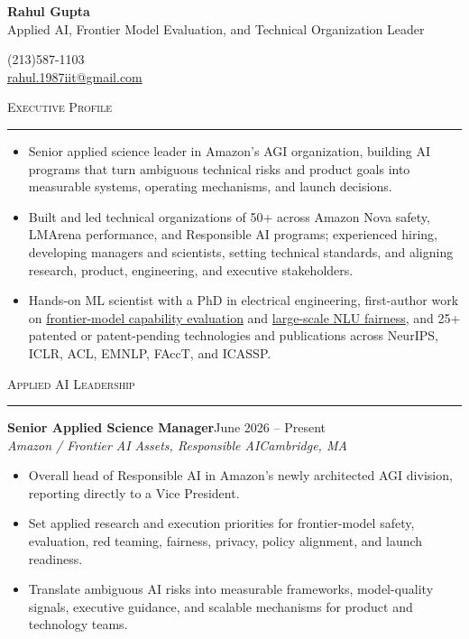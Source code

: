 \documentclass[11pt]{article}
\newcommand{\sectionheading}[1]{%
  \vspace{8pt}%
  {\large\scshape #1}\par\vspace{1pt}\hrule\vspace{3pt}%
}
\newcommand{\resumeentry}[5]{%
  \textbf{#1}\hfill #2\\
  \textit{#3}\hfill \textit{#4}
  \begin{itemize}
    #5
  \end{itemize}
  \vspace{2pt}
}
\newcommand{\socialicons}{%
  \href{https://www.linkedin.com/in/rahul-gupta-16139818}{\textcolor[HTML]{0077B5}{\Large\faLinkedin}}%
  \hspace{0.55em}%
  \href{https://scholar.google.com/citations?user=gSTLsFcAAAAJ}{\textcolor[HTML]{4285F4}{\Large\aiGoogleScholarSquare}}%
}
\begin{document}
\begin{center}
  {\LARGE\bfseries Rahul Gupta}\\[4pt]
  {\large Applied AI, Frontier Model Evaluation, and Technical Organization Leader}
\end{center}

\vspace{10pt}

\begin{minipage}[t]{0.48\textwidth}
  (213)587-1103\\
  \href{mailto:rahul.1987iit@gmail.com}{rahul.1987iit@gmail.com}
\end{minipage}
\hfill
\begin{minipage}[t]{0.48\textwidth}
  \raggedleft
  \socialicons
\end{minipage}

\sectionheading{Executive Profile}
\begin{itemize}
  \item Senior applied science leader in Amazon's AGI organization, building AI programs that turn ambiguous technical risks and product goals into measurable systems, operating mechanisms, and launch decisions.
  \item Built and led technical organizations of 50+ across Amazon Nova safety, LMArena performance, and Responsible AI programs; experienced hiring, developing managers and scientists, setting technical standards, and aligning research, product, engineering, and executive stakeholders.
  \item Hands-on ML scientist with a PhD in electrical engineering, first-author work on \href{https://arxiv.org/abs/2607.12200}{frontier-model capability evaluation} and \href{https://dl.acm.org/doi/abs/10.1145/3539597.3575785}{large-scale NLU fairness}, and 25+ patented or patent-pending technologies and publications across NeurIPS, ICLR, ACL, EMNLP, FAccT, and ICASSP.
\end{itemize}

\sectionheading{Applied AI Leadership}

\resumeentry
  {Senior Applied Science Manager}
  {June 2026 -- Present}
  {Amazon / Frontier AI Assets, Responsible AI}
  {Cambridge, MA}
  {\item Overall head of Responsible AI in Amazon's newly architected AGI division, reporting directly to a Vice President.
   \item Set applied research and execution priorities for frontier-model safety, evaluation, red teaming, fairness, privacy, policy alignment, and launch readiness.
   \item Translate ambiguous AI risks into measurable frameworks, model-quality signals, executive guidance, and scalable mechanisms for product and technology teams.}
\end{document}
